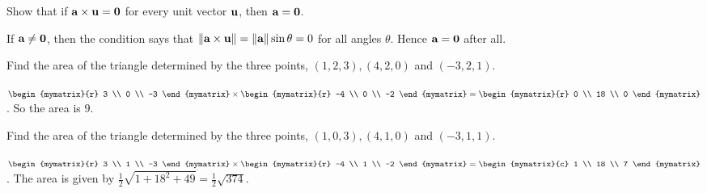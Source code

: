 \begin{enumialphparenastyle}

\begin{ex}
  Show that if $\mbox{\bf a}\times \mbox{\bf u}=\mbox{\bf 0}$ for every unit
  vector $\mbox{\bf u}$, then $\mbox{\bf a}=\mbox{\bf 0}$.
  \begin{sol}
    If $\mbox{\bf a}\neq \mbox{\bf 0}$, then the condition says that
    $\left\|\mbox{\bf a}\times \mbox{\bf u}\right\| = \left\|\mbox{\bf a}\right\| \sin \theta =0$
    for all angles $\theta$. Hence $\mbox{\bf a} = \mbox{\bf 0}$ after all.
  \end{sol}
\end{ex}

\begin{ex}
  Find the area of the triangle determined by the three points,
  $(1,2,3) ,(4,2,0) $ and $(-3,2,1)$.
  \begin{sol}
    $\begin{mymatrix}{r}
      3 \\
      0 \\
      -3
    \end{mymatrix} \times \begin{mymatrix}{r}
      -4 \\
      0 \\
      -2
    \end{mymatrix} =\begin{mymatrix}{r}
      0 \\
      18 \\
      0
    \end{mymatrix}$. So the area is $9$.
  \end{sol}
\end{ex}

\begin{ex}
  Find the area of the triangle determined by the three points,
  $(1,0,3) ,(4,1,0) $ and $(-3,1,1)$.
  \begin{sol}
    $\begin{mymatrix}{r}
      3 \\
      1 \\
      -3
    \end{mymatrix} \times \begin{mymatrix}{r}
      -4 \\
      1 \\
      -2
    \end{mymatrix} =\begin{mymatrix}{c}
      1 \\
      18 \\
      7
    \end{mymatrix}$. The area is given by
    $\displaystyle\frac{1}{2}\sqrt{1+18^{2}+49}=\frac{1}{2}\sqrt{374}$.
  \end{sol}
\end{ex}


\end{enumialphparenastyle}
